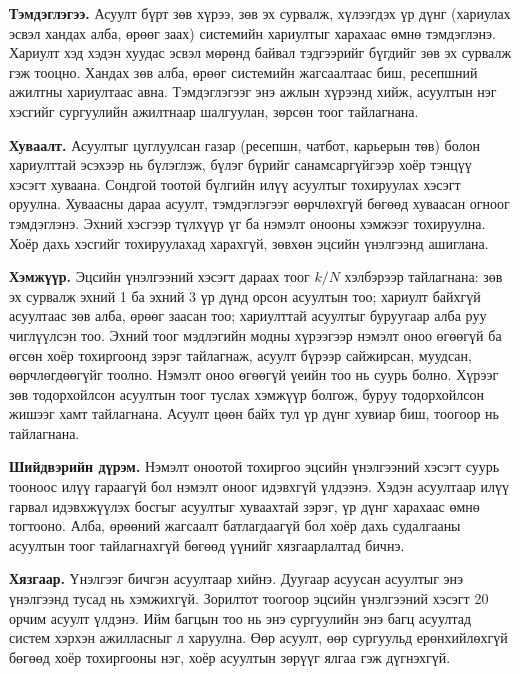 \textbf{Тэмдэглэгээ.} Асуулт бүрт зөв хүрээ, зөв эх сурвалж, хүлээгдэх үр дүнг (хариулах эсвэл хандах алба, өрөөг заах) системийн хариултыг харахаас өмнө тэмдэглэнэ. Хариулт хэд хэдэн хуудас эсвэл мөрөнд байвал тэдгээрийг бүгдийг зөв эх сурвалж гэж тооцно. Хандах зөв алба, өрөөг системийн жагсаалтаас биш, ресепшний ажилтны хариултаас авна. Тэмдэглэгээг энэ ажлын хүрээнд хийж, асуултын нэг хэсгийг сургуулийн ажилтнаар шалгуулан, зөрсөн тоог тайлагнана.

\textbf{Хуваалт.} Асуултыг цуглуулсан газар (ресепшн, чатбот, карьерын төв) болон хариулттай эсэхээр нь бүлэглэж, бүлэг бүрийг санамсаргүйгээр хоёр тэнцүү хэсэгт хуваана. Сондгой тоотой бүлгийн илүү асуултыг тохируулах хэсэгт оруулна. Хуваасны дараа асуулт, тэмдэглэгээг өөрчлөхгүй бөгөөд хуваасан огноог тэмдэглэнэ. Эхний хэсгээр түлхүүр үг ба нэмэлт онооны хэмжээг тохируулна. Хоёр дахь хэсгийг тохируулахад харахгүй, зөвхөн эцсийн үнэлгээнд ашиглана.

\textbf{Хэмжүүр.} Эцсийн үнэлгээний хэсэгт дараах тоог $k/N$ хэлбэрээр тайлагнана: зөв эх сурвалж эхний 1 ба эхний 3 үр дүнд орсон асуултын тоо; хариулт байхгүй асуултаас зөв алба, өрөөг заасан тоо; хариулттай асуултыг буруугаар алба руу чиглүүлсэн тоо. Эхний тоог мэдлэгийн модны хүрээгээр нэмэлт оноо өгөөгүй ба өгсөн хоёр тохиргоонд зэрэг тайлагнаж, асуулт бүрээр сайжирсан, муудсан, өөрчлөгдөөгүйг тоолно. Нэмэлт оноо өгөөгүй үеийн тоо нь суурь болно. Хүрээг зөв тодорхойлсон асуултын тоог туслах хэмжүүр болгож, буруу тодорхойлсон жишээг хамт тайлагнана. Асуулт цөөн байх тул үр дүнг хувиар биш, тоогоор нь тайлагнана.

\textbf{Шийдвэрийн дүрэм.} Нэмэлт оноотой тохиргоо эцсийн үнэлгээний хэсэгт суурь тооноос илүү гараагүй бол нэмэлт оноог идэвхгүй үлдээнэ. Хэдэн асуултаар илүү гарвал идэвхжүүлэх босгыг асуултыг хуваахтай зэрэг, үр дүнг харахаас өмнө тогтооно. Алба, өрөөний жагсаалт батлагдаагүй бол хоёр дахь судалгааны асуултын тоог тайлагнахгүй бөгөөд үүнийг хязгаарлалтад бичнэ.

\textbf{Хязгаар.} Үнэлгээг бичгэн асуултаар хийнэ. Дуугаар асуусан асуултыг энэ үнэлгээнд тусад нь хэмжихгүй. Зорилтот тоогоор эцсийн үнэлгээний хэсэгт 20 орчим асуулт үлдэнэ. Ийм багцын тоо нь энэ сургуулийн энэ багц асуултад систем хэрхэн ажилласныг л харуулна. Өөр асуулт, өөр сургуульд ерөнхийлөхгүй бөгөөд хоёр тохиргооны нэг, хоёр асуултын зөрүүг ялгаа гэж дүгнэхгүй.
